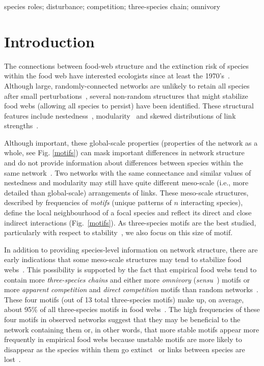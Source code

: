\documentclass[12pt]{article}
\begin{document}
\begin{spacing}{2.0}
	species roles; disturbance; competition; three-species chain; omnivory

\clearpage
    
\section*{Introduction}

	The connections between food-web structure and the extinction risk of species within the food web have interested ecologists since at least the 1970's~\citep{May1972}. Although large, randomly-connected networks are unlikely to retain all species after small perturbations~\citep{Gardner1970,May1972}, several non-random structures that might stabilize food webs (allowing all species to persist) have been identified. These structural features include nestedness~\citep{Allesina2012,Sauve2014}, modularity~\citep{Sauve2014,Thebault2010} and skewed distributions of link strengths~\citep{McCann1998,Gross2009,Rooney2012,Wootton2016}.
	
	
	Although important, these global-scale properties (properties of the network as a whole, see Fig. \ref{motifs}) can mask important differences in network structure~\citep{Simmons2019} and do not provide information about differences between species within the same network~\citep{Cirtwill2018FoodWebs}. 
	Two networks with the same connectance and similar values of nestedness and modularity may still have quite different meso-scale (i.e., more detailed than global-scale) arrangements of links. 
	These meso-scale structures, described by frequencies of \emph{motifs} (unique patterns of $n$ interacting species), define the local neighbourhood of a focal species and reflect its direct and close indirect interactions (Fig.~\ref{motifs}).
    As three-species motifs are the best studied, particularly with respect to stability~\citep{Stouffer2007,Borrelli2015,Borrelli2015a,Giling2019b}, we also focus on this size of motif.
	
	
    In addition to providing species-level information on network structure, there are early indications that some meso-scale structures may tend to stabilize food webs~\citep{Prill2005,Borrelli2015,Monteiro2016}. 
    This possibility is supported by the fact that empirical food webs tend to contain more \emph{three-species chains} and either more \emph{omnivory} (\emph{sensu}~\citealp[]{Thompson2007b}) motifs or more \emph{apparent competition} and \emph{direct competition} motifs than random networks~\citep{Stouffer2007}. 
    These four motifs (out of 13 total three-species motifs) make up, on average, about 95\% of all three-species motifs in food webs~\citep{Stouffer2010b}. 
    The high frequencies of these four motifs in observed networks suggest that they may be beneficial to the network containing them or, in other words, that more stable motifs appear more frequently in empirical food webs because unstable motifs are more likely to disappear as the species within them go extinct~\citep{Borrelli2015,Borrelli2015a} or links between species are lost~\citep{Tylianakis2010}.


\end{spacing}
\end{document}
